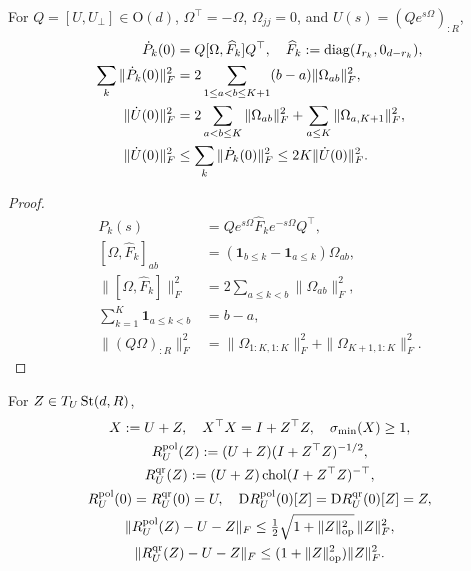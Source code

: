 \begin{lemma}\label{lem:rigid-differential}
For $Q=[U,U_\perp]\in\mathrm O(d)$, $\Omega^\top=-\Omega$,
$\Omega_{jj}=0$, and $U(s)=(Qe^{s\Omega})_{:R}$,
\begin{align}
 \dot P_k(0)&=Q[\Omega,\widehat F_k]Q^\top,\quad
 \widehat F_k:=\operatorname{diag}(I_{r_k},0_{d-r_k}),\\
 \sum_k\|\dot P_k(0)\|_F^2
 &=2\sum_{1\le a<b\le K+1}(b-a)\|\Omega_{ab}\|_F^2,\\
 \|\dot U(0)\|_F^2
 &=2\sum_{a<b\le K}\|\Omega_{ab}\|_F^2
   +\sum_{a\le K}\|\Omega_{a,K+1}\|_F^2,\\
 \|\dot U(0)\|_F^2
 &\le\sum_k\|\dot P_k(0)\|_F^2
 \le2K\|\dot U(0)\|_F^2.
\end{align}
\end{lemma}
\begin{proof}
\begin{align}
 P_k(s)&=Qe^{s\Omega}\widehat F_ke^{-s\Omega}Q^\top,\\
 [\Omega,\widehat F_k]_{ab}
 &=(\mathbf1_{b\le k}-\mathbf1_{a\le k})\Omega_{ab},\\
 \|[\Omega,\widehat F_k]\|_F^2
 &=2\sum_{a\le k<b}\|\Omega_{ab}\|_F^2,\\
 \sum_{k=1}^K\mathbf1_{a\le k<b}&=b-a,\\
 \|(Q\Omega)_{:R}\|_F^2
 &=\|\Omega_{1:K,1:K}\|_F^2+\|\Omega_{K+1,1:K}\|_F^2.
\end{align}
\end{proof}
\begin{proposition}\label{prop:rigid-retract}
For $Z\in T_U\operatorname{St}(d,R)$,
\begin{gather}
 X:=U+Z,\quad X^\top X=I+Z^\top Z,\quad\sigma_{\min}(X)\ge1,\\
 R_U^{\mathrm{pol}}(Z):=(U+Z)(I+Z^\top Z)^{-1/2},\\
 R_U^{\mathrm{qr}}(Z):=(U+Z)\operatorname{chol}(I+Z^\top Z)^{-\top},\\
 R_U^{\mathrm{pol}}(0)=R_U^{\mathrm{qr}}(0)=U,\quad
 \mathrm DR_U^{\mathrm{pol}}(0)[Z]=\mathrm DR_U^{\mathrm{qr}}(0)[Z]=Z,\\
 \|R_U^{\mathrm{pol}}(Z)-U-Z\|_F\le
 \tfrac12\sqrt{1+\|Z\|_{\mathrm{op}}^2}\,\|Z\|_F^2,\\
 \|R_U^{\mathrm{qr}}(Z)-U-Z\|_F\le
 (1+\|Z\|_{\mathrm{op}}^2)\|Z\|_F^2.
 \label{eq:rigid-qr-error}
\end{gather}
\end{proposition}
